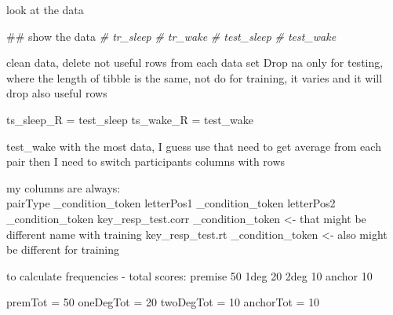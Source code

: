 \documentclass[]{article}
\newenvironment{Shaded}{\begin{snugshade}}{\end{snugshade}}
\newcommand{\KeywordTok}[1]{\textcolor[rgb]{0.13,0.29,0.53}{\textbf{#1}}}
\newcommand{\DecValTok}[1]{\textcolor[rgb]{0.00,0.00,0.81}{#1}}
\newcommand{\StringTok}[1]{\textcolor[rgb]{0.31,0.60,0.02}{#1}}
\newcommand{\CommentTok}[1]{\textcolor[rgb]{0.56,0.35,0.01}{\textit{#1}}}
\newcommand{\OperatorTok}[1]{\textcolor[rgb]{0.81,0.36,0.00}{\textbf{#1}}}
\newcommand{\NormalTok}[1]{#1}
\begin{document}
look at the data

\begin{Shaded}
\begin{Highlighting}[]
\NormalTok{## show the data}
\CommentTok{# tr_sleep}
\CommentTok{# tr_wake}
\CommentTok{# test_sleep}
\CommentTok{# test_wake}
\end{Highlighting}
\end{Shaded}

clean data, delete not useful rows from each data set Drop na only for
testing, where the length of tibble is the same, not do for training, it
varies and it will drop also useful rows

\begin{Shaded}
\end{Shaded}

\begin{Shaded}
\begin{Highlighting}[]
\NormalTok{ts_sleep_R =}\StringTok{ }\NormalTok{test_sleep}
\NormalTok{ts_wake_R =}\StringTok{ }\NormalTok{test_wake}
\end{Highlighting}
\end{Shaded}

test\_wake with the most data, I guess use that need to get average from
each pair then I need to switch participants columns with rows

my columns are always:\\
pairType \_condition\_token letterPos1 \_condition\_token letterPos2
\_condition\_token key\_resp\_test.corr \_condition\_token \textless{}-
that might be different name with training key\_resp\_test.rt
\_condition\_token \textless{}- also might be different for training

to calculate frequencies - total scores: premise 50 1deg 20 2deg 10
anchor 10

\begin{Shaded}
\begin{Highlighting}[]
\NormalTok{premTot =}\StringTok{ }\DecValTok{50}
\NormalTok{oneDegTot =}\StringTok{ }\DecValTok{20}
\NormalTok{twoDegTot =}\StringTok{ }\DecValTok{10}
\NormalTok{anchorTot =}\StringTok{ }\DecValTok{10}
\end{Highlighting}
\end{Shaded}
\end{document}
